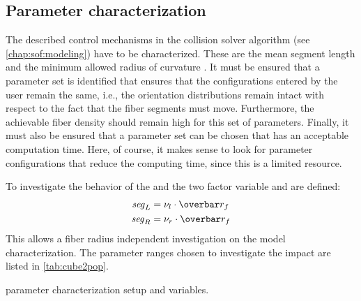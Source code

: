 \subsection{Parameter characterization}\label{sec:modelSetup}
% 
The described control mechanisms in the collision solver algorithm  (see \cref{chap:sof:modeling}) have to be characterized.
These are the mean segment length \segLength{} and the minimum allowed radius of curvature \segRadius{}.
It must be ensured that a parameter set is identified that ensures that the configurations entered by the user remain the same, i.e., the orientation distributions remain intact with respect to the fact that the fiber segments must move.
Furthermore, the achievable fiber density should remain high for this set of parameters.
Finally, it must also be ensured that a parameter set can be chosen that has an acceptable computation time.
Here, of course, it makes sense to look for parameter configurations that reduce the computing time, since this is a limited resource.
\par
% 
To investigate the behavior of the \segLength{} and \segRadius{} the two factor variable \segLengthFactor{} and \segRadiusFactor{} are defined:
\begin{align}
    \begin{split}
        \segLength &= \segLengthFactor \cdot \fiberRadiusMean\\
        \segRadius &= \segRadiusFactor \cdot \fiberRadiusMean
    \end{split}
\end{align}
This allows a fiber radius independent investigation on the model characterization.
The parameter ranges chosen to investigate the impact are listed in \cref{tab:cube2pop}.
% 
\begin{table}[!b]
%
\centering
{}
\caption{parameter characterization setup and variables.}
\label{tab:cube2pop}
\end{table}

